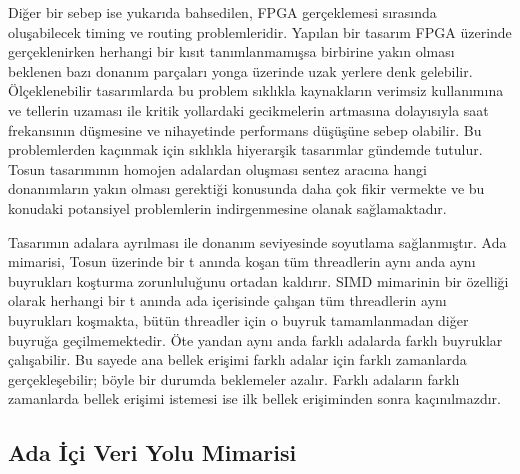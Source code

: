 Diğer bir sebep ise yukarıda bahsedilen, FPGA gerçeklemesi sırasında oluşabilecek timing ve routing problemleridir. Yapılan bir tasarım FPGA üzerinde gerçeklenirken herhangi bir kısıt tanımlanmamışsa birbirine yakın olması beklenen bazı donanım parçaları yonga üzerinde uzak yerlere denk gelebilir. Ölçeklenebilir tasarımlarda bu problem sıklıkla kaynakların verimsiz kullanımına ve tellerin uzaması ile kritik yollardaki gecikmelerin artmasına dolayısıyla saat frekansının düşmesine ve nihayetinde performans düşüşüne sebep olabilir. Bu problemlerden kaçınmak için sıklıkla hiyerarşik tasarımlar gündemde tutulur. Tosun tasarımının homojen adalardan oluşması sentez aracına hangi donanımların yakın olması gerektiği konusunda daha çok fikir vermekte ve bu konudaki potansiyel problemlerin indirgenmesine olanak sağlamaktadır.\par 
Tasarımın adalara ayrılması ile donanım seviyesinde soyutlama sağlanmıştır. Ada mimarisi, Tosun üzerinde bir t anında koşan tüm threadlerin aynı anda aynı buyrukları koşturma zorunluluğunu ortadan kaldırır. SIMD mimarinin bir özelliği olarak herhangi bir t anında ada içerisinde çalışan tüm threadlerin aynı buyrukları koşmakta, bütün threadler için o buyruk tamamlanmadan diğer buyruğa geçilmemektedir. Öte yandan aynı anda farklı adalarda farklı buyruklar çalışabilir. Bu sayede ana bellek erişimi farklı adalar için farklı zamanlarda gerçekleşebilir; böyle bir durumda beklemeler azalır. Farklı adaların farklı zamanlarda bellek erişimi istemesi ise ilk bellek erişiminden sonra kaçınılmazdır.  

\subsection{Ada İçi Veri Yolu Mimarisi}

